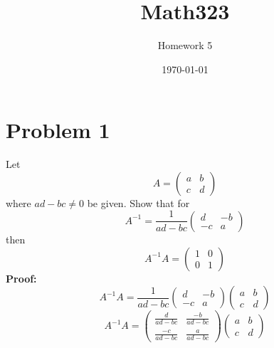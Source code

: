 \documentclass{article} %
\title{Math323} %
\author{Homework 5} %
\date{\today} %
\begin{document}
    \maketitle %
    
    \section*{Problem 1} %
    Let
    \begin{equation} %
      A = \begin{pmatrix} a & b \\ c & d \end{pmatrix}
    \end{equation}
    where $ad-bc \neq 0$ be given. Show that for
    \begin{equation}
      A^{-1} = \frac{1}{ad-bc} \begin{pmatrix} d & -b \\ -c & a \end{pmatrix}
    \end{equation}
    then
    \begin{equation}
      A^{-1}A = \begin{pmatrix} 1 & 0 \\ 0 & 1 \end{pmatrix}
    \end{equation}
    \textbf{Proof:}
    \begin{equation}
      A^{-1}A = \frac{1}{ad-bc} \begin{pmatrix} d & -b \\ -c & a \end{pmatrix} \begin{pmatrix} a & b \\ c & d \end{pmatrix} 
    \end{equation}
    \begin{equation}
      A^{-1}A = \begin{pmatrix} \frac{d}{ad-bc} & \frac{-b}{ad-bc} \\ \frac{-c}{ad-bc} & \frac{a}{ad-bc} \end{pmatrix} \begin{pmatrix} a & b \\ c & d \end{pmatrix}
    \end{equation}
\end{document}
